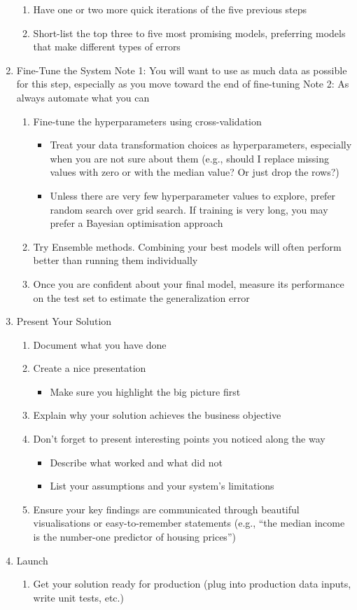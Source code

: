 \documentclass[11pt]{article}
\begin{document}
\begin{enumerate}
\begin{enumerate}
\item Have one or two more quick iterations of the five previous steps
\item Short-list the top three to five most promising models, preferring models that make different types of errors
\end{enumerate}
\item Fine-Tune the System
Note 1: You will want to use as much data as possible for this step, especially as you move toward the end of fine-tuning
Note 2: As always automate what you can
\begin{enumerate}
\item Fine-tune the hyperparameters using cross-validation
\begin{itemize}
\item Treat your data transformation choices as hyperparameters, especially when you are not sure about them (e.g., should I replace missing values with zero or with the median value? Or just drop the rows?)
\item Unless there are very few hyperparameter values to explore, prefer random search over grid search. If training is very long, you may prefer a Bayesian optimisation approach
\end{itemize}
\item Try Ensemble methods. Combining your best models will often perform better than running them individually
\item Once you are confident about your final model, measure its performance on the test set to estimate the generalization error
\end{enumerate}
\item Present Your Solution
\begin{enumerate}
\item Document what you have done
\item Create a nice presentation
\begin{itemize}
\item Make sure you highlight the big picture first
\end{itemize}
\item Explain why your solution achieves the business objective
\item Don’t forget to present interesting points you noticed along the way
\begin{itemize}
\item Describe what worked and what did not
\item List your assumptions and your system’s limitations
\end{itemize}
\item Ensure your key findings are communicated through beautiful visualisations or easy-to-remember statements (e.g., “the median income is the number-one predictor of housing prices”)
\end{enumerate}
\item Launch
\begin{enumerate}
\item Get your solution ready for production (plug into production data inputs, write unit tests, etc.)


\end{enumerate}
\end{enumerate}
\end{document}
